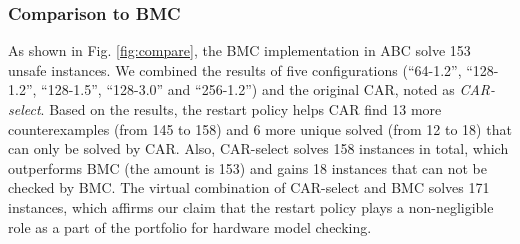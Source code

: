 \subsubsection{Comparison to BMC }
As shown in Fig. \ref{fig:compare}, the BMC implementation in ABC solve 153 unsafe instances. We combined the results of five configurations (``64-1.2'', ``128-1.2'', ``128-1.5'', ``128-3.0'' and ``256-1.2'') and the original CAR, noted as \emph{CAR-select}. Based on the results, the restart policy helps CAR find 13 more counterexamples (from 145 to 158) and 6 more unique solved (from 12 to 18) that can only be solved by CAR. Also, CAR-select solves 158 instances in total, which outperforms BMC (the amount is 153) and gains 18 instances that can not be checked by BMC. The virtual combination of CAR-select and BMC solves 171 instances, which affirms our claim that the restart policy plays a non-negligible role as a part of the portfolio for hardware model checking.
